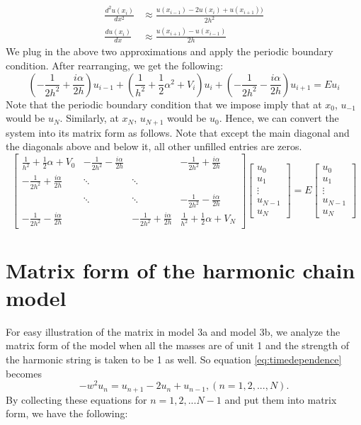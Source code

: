\begin{align*} 
\frac{d^2u(x_i)}{dx^2} & \approx \frac{u(x_{i-1})-2u(x_i)+u(x_{i+1}))}{2h^2} \\
\frac{du(x_i)}{dx} & \approx \frac{u(x_{i+1})-u(x_{i-1})}{2h}
\end{align*}
We plug in the above two approximations and apply the periodic boundary condition. After rearranging, we get the following: 
\begin{equation} \label{eq:dis_periodic}
(-\frac{1}{2h^2}+\frac{i\alpha}{2h})u_{i-1} + (\frac{1}{h^2}+\frac{1}{2}\alpha^2+V_i)u_i+(-\frac{1}{2h^2}-\frac{i\alpha}{2h})u_{i+1} = Eu_i  
\end{equation}
Note that the periodic boundary condition that we impose imply that at $x_0$, $u_{-1}$ would be $u_{N}$. Similarly, at $x_N$, $u_{N+1}$ would be $u_{0}$. 
Hence, we can convert the system into its matrix form as follows. Note that except the main diagonal and the diagonals above and below it, all other unfilled entries are zeros. 
\begin{equation} \label{eq:matrix2}
\left[ \begin{matrix}
\frac{1}{h^2}+\frac{1}{2}\alpha+V_0 & -\frac{1}{2h^2}-\frac{i\alpha}{2h} & & -\frac{1}{2h^2}+\frac{i\alpha}{2h}\\
-\frac{1}{2h^2}+\frac{i\alpha}{2h} & \ddots & \ddots & \\
& \ddots & \ddots & -\frac{1}{2h^2}-\frac{i\alpha}{2h} \\
-\frac{1}{2h^2}-\frac{i\alpha}{2h} & & -\frac{1}{2h^2}+\frac{i\alpha}{2h} & \frac{1}{h^2}+\frac{1}{2}\alpha+V_{N} \end{matrix} \right]
\begin{bmatrix}
    u_{0}  \\
    u_{1}  \\
    \vdots  \\
    u_{N-1}\\
    u_{N}
    \end{bmatrix} = E\begin{bmatrix}
    u_{0}  \\
    u_{1}  \\
    \vdots  \\
    u_{N-1}\\
    u_{N}
    \end{bmatrix}
\end{equation}


\section{Matrix form of the harmonic chain model}
For easy illustration of the matrix in model 3a and model 3b, we analyze the matrix form of the model when all the masses are of unit 1 and the strength of the harmonic string is taken to be 1 as well. So equation \ref{eq:timedependence} becomes
\begin{equation}\label{eq:model3 regular}
-w^2u_n = u_{n+1}-2u_n +u_{n-1}, (n = 1,2,...,N). 
\end{equation}
By collecting these equations for $n=1,2,...N-1$ and put them into matrix form, we have the following:

